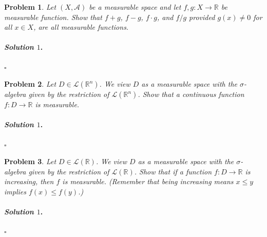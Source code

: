 \documentclass[reqno]{amsart}
\theoremstyle{plain}
\newtheorem{problem}{Problem}
\theoremstyle{definition}
\newenvironment{solution1}{\paragraph{\emph{Solution $1$}.}}{\hfill$\square$}
\begin{document}
\begin{problem}
Let $(X,\mathcal{A})$ be a measurable space and let $f,g:X \rightarrow \mathbb{R}$ be measurable function.  Show that $f + g$, $f - g$, $f \cdot g$, and $f/g$ provided $g(x) \neq 0$ for all $x \in X$, are all measurable functions.
\end{problem}
\begin{solution1}

\end{solution1}


\begin{problem}
Let $D \in \mathcal{L}(\mathbb{R}^{n})$.  We view $D$ as a measurable space with the $\sigma$-algebra given by the restriction of $\mathcal{L}(\mathbb{R}^{n})$.  Show that a continuous function $f: D \rightarrow \mathbb{R}$ is measurable.
\end{problem}
\begin{solution1}

\end{solution1}

\begin{problem}
Let $D \in \mathcal{L}(\mathbb{R})$.  We view $D$ as a measurable space with the $\sigma$-algebra given by the restriction of $\mathcal{L}(\mathbb{R})$.  Show that if a function $f:D \rightarrow \mathbb{R}$ is increasing, then $f$ is measurable.  (Remember that being increasing means $x \le y$ implies $f(x) \le f(y)$.)
\end{problem}
\begin{solution1}

\end{solution1}
\end{document}
